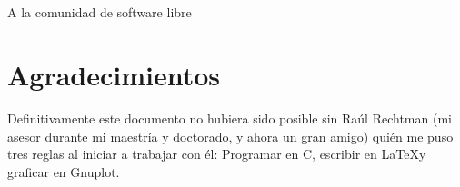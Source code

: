 \chapter*{}
\thispagestyle{empty}


\begin{center}
A la comunidad de software libre
\end{center}

\newpage
\thispagestyle{empty}
\chapter*{Agradecimientos}

Definitivamente este documento no hubiera sido posible sin  Raúl Rechtman (mi asesor durante mi maestría y doctorado, y ahora un gran amigo) quién me puso tres reglas al iniciar a trabajar con él: Programar en C, escribir en \LaTeX y graficar en Gnuplot.
